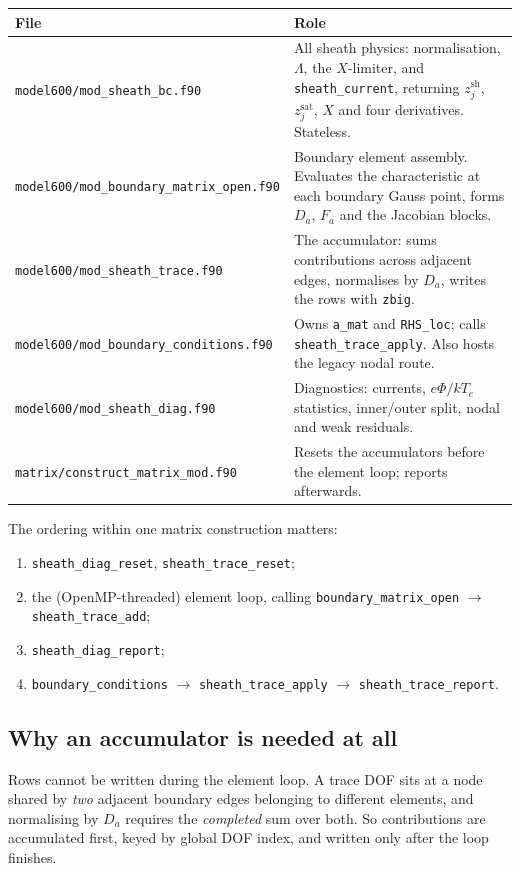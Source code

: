 \documentclass[11pt,a4paper]{article}
\newcommand{\zjsat}{z^{\mathrm{sat}}_{j}}
\newcommand{\zjsh}{z^{\mathrm{sh}}_{j}}
\newcommand{\code}[1]{\texttt{\small #1}}
\begin{document}
\begin{table}[h]\centering\small
\begin{tabular}{@{}lp{9.4cm}@{}}
\toprule
\textbf{File} & \textbf{Role} \\
\midrule
\code{model600/mod\_sheath\_bc.f90} & All sheath physics: normalisation, $\Lambda$, the $X$-limiter,
  and \code{sheath\_current}, returning $\zjsh$, $\zjsat$, $X$ and four derivatives. Stateless. \\
\code{model600/mod\_boundary\_matrix\_open.f90} & Boundary element assembly. Evaluates the
  characteristic at each boundary Gauss point, forms $D_a$, $F_a$ and the Jacobian blocks. \\
\code{model600/mod\_sheath\_trace.f90} & The accumulator: sums contributions across adjacent edges,
  normalises by $D_a$, writes the rows with \code{zbig}. \\
\code{model600/mod\_boundary\_conditions.f90} & Owns \code{a\_mat} and \code{RHS\_loc}; calls
  \code{sheath\_trace\_apply}. Also hosts the legacy nodal route. \\
\code{model600/mod\_sheath\_diag.f90} & Diagnostics: currents, $e\Phi/kT_e$ statistics, inner/outer
  split, nodal and weak residuals. \\
\code{matrix/construct\_matrix\_mod.f90} & Resets the accumulators before the element loop; reports
  afterwards. \\
\bottomrule
\end{tabular}
\end{table}

The ordering within one matrix construction matters:
\begin{enumerate}\itemsep2pt
  \item \code{sheath\_diag\_reset}, \code{sheath\_trace\_reset};
  \item the (OpenMP-threaded) element loop, calling \code{boundary\_matrix\_open} $\to$
        \code{sheath\_trace\_add};
  \item \code{sheath\_diag\_report};
  \item \code{boundary\_conditions} $\to$ \code{sheath\_trace\_apply} $\to$
        \code{sheath\_trace\_report}.
\end{enumerate}

\subsection{Why an accumulator is needed at all}

Rows cannot be written during the element loop. A trace DOF sits at a node shared by \emph{two}
adjacent boundary edges belonging to different elements, and normalising by $D_a$ requires the
\emph{completed} sum over both. So contributions are accumulated first, keyed by global DOF index, and
written only after the loop finishes.
\end{document}
